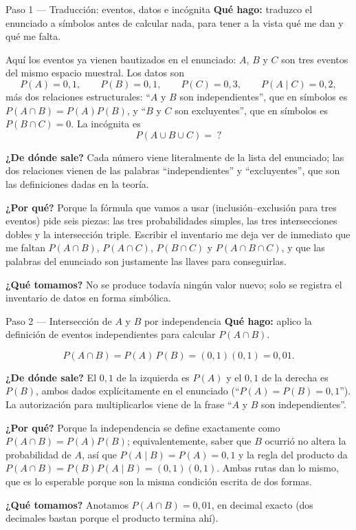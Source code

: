 \documentclass[11pt]{article}
\begin{document}
\begin{paso}{Paso 1 --- Traducción: eventos, datos e incógnita}
\textbf{Qué hago:} traduzco el enunciado a símbolos antes de calcular nada, para tener a la vista qué me dan y qué me falta.

Aquí los eventos ya vienen bautizados en el enunciado: $A$, $B$ y $C$ son tres eventos del mismo espacio muestral. Los datos son
\[
P(A)=0{,}1,\qquad P(B)=0{,}1,\qquad P(C)=0{,}3,\qquad P(A\mid C)=0{,}2,
\]
más dos relaciones estructurales: ``$A$ y $B$ son independientes'', que en símbolos es $P(A\cap B)=P(A)P(B)$, y ``$B$ y $C$ son excluyentes'', que en símbolos es $P(B\cap C)=0$. La incógnita es
\[
P(A\cup B\cup C)=\;?
\]

\textbf{¿De dónde sale?} Cada número viene literalmente de la lista del enunciado; las dos relaciones vienen de las palabras ``independientes'' y ``excluyentes'', que son las definiciones dadas en la teoría.

\textbf{¿Por qué?} Porque la fórmula que vamos a usar (inclusión--exclusión para tres eventos) pide seis piezas: las tres probabilidades simples, las tres intersecciones dobles y la intersección triple. Escribir el inventario me deja ver de inmediato que me faltan $P(A\cap B)$, $P(A\cap C)$, $P(B\cap C)$ y $P(A\cap B\cap C)$, y que las palabras del enunciado son justamente las llaves para conseguirlas.

\textbf{¿Qué tomamos?} No se produce todavía ningún valor nuevo; solo se registra el inventario de datos en forma simbólica.
\end{paso}

\begin{paso}{Paso 2 --- Intersección de $A$ y $B$ por independencia}
\textbf{Qué hago:} aplico la definición de eventos independientes para calcular $P(A\cap B)$.

\[
P(A\cap B)=P(A)\,P(B)=(0{,}1)(0{,}1)=0{,}01.
\]

\textbf{¿De dónde sale?} El $0{,}1$ de la izquierda es $P(A)$ y el $0{,}1$ de la derecha es $P(B)$, ambos dados explícitamente en el enunciado (``$P(A)=P(B)=0{,}1$''). La autorización para multiplicarlos viene de la frase ``$A$ y $B$ son independientes''.

\textbf{¿Por qué?} Porque la independencia se define exactamente como $P(A\cap B)=P(A)P(B)$; equivalentemente, saber que $B$ ocurrió no altera la probabilidad de $A$, así que $P(A\mid B)=P(A)=0{,}1$ y la regla del producto da $P(A\cap B)=P(B)P(A\mid B)=(0{,}1)(0{,}1)$. Ambas rutas dan lo mismo, que es lo esperable porque son la misma condición escrita de dos formas.

\textbf{¿Qué tomamos?} Anotamos $P(A\cap B)=0{,}01$, en decimal exacto (dos decimales bastan porque el producto termina ahí).
\end{paso}
\end{document}

